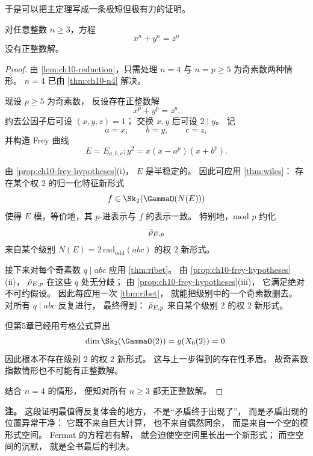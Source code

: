 于是可以把主定理写成一条极短但极有力的证明。

\begin{theorem}[费马大定理]
\label{thm:flt}
对任意整数 $n\ge 3$，方程
\[
  x^n+y^n=z^n
\]
没有正整数解。
\end{theorem}

\begin{proof}
由 \cref{lem:ch10-reduction}，只需处理 $n=4$ 与 $n=p\ge 5$ 为奇素数两种情形。
$n=4$ 已由 \cref{thm:ch10-n4} 解决。

现设 $p\ge 5$ 为奇素数，
反设存在正整数解
\[
  x^p+y^p=z^p.
\]
约去公因子后可设 $(x,y,z)=1$；
交换 $x,y$ 后可设 $2\mid y$。
记
\[
  a=x,\qquad b=y,\qquad c=z,
\]
并构造 Frey 曲线
\[
  E=E_{a,b,c}\colon y^2=x(x-a^p)(x+b^p).
\]

由 \cref{prop:ch10-frey-hypotheses}(i)，
$E$ 是半稳定的。
因此可应用 \cref{thm:wiles}：
存在某个权 $2$ 的归一化特征新形式
\[
  f\in \Sk_2(\GammaO(N(E)))
\]
使得 $E$ 模，等价地，其 $p$-进表示与 $f$ 的表示一致。
特别地，mod $p$ 约化
\[
  \bar{\rho}_{E,p}
\]
来自某个级别 $N(E)=2\,\mathrm{rad}_{\mathrm{odd}}(abc)$ 的权 $2$ 新形式。

接下来对每个奇素数 $q\mid abc$ 应用 \cref{thm:ribet}。
由 \cref{prop:ch10-frey-hypotheses}(ii)，
$\bar{\rho}_{E,p}$ 在这些 $q$ 处无分歧；
由 \cref{prop:ch10-frey-hypotheses}(iii)，
它满足绝对不可约假设。
因此每应用一次 \cref{thm:ribet}，
就能把级别中的一个奇素数删去。
对所有 $q\mid abc$ 反复进行，
最终得到：
$\bar{\rho}_{E,p}$ 来自某个级别 $2$ 的权 $2$ 新形式。

但第5章已经用亏格公式算出
\[
  \dim \Sk_2(\GammaO(2))=g(X_0(2))=0.
\]
因此根本不存在级别 $2$ 的权 $2$ 新形式。
这与上一步得到的存在性矛盾。
故奇素数指数情形也不可能有正整数解。

结合 $n=4$ 的情形，
便知对所有 $n\ge 3$ 都无正整数解。
\end{proof}

\textbf{注。}
这段证明最值得反复体会的地方，
不是“矛盾终于出现了”，
而是矛盾出现的位置异常干净：
它既不来自巨大计算，
也不来自偶然同余，
而是来自一个空的模形式空间。
Fermat 的方程若有解，
就会迫使空空间里长出一个新形式；
而空空间的沉默，
就是全书最后的判决。
